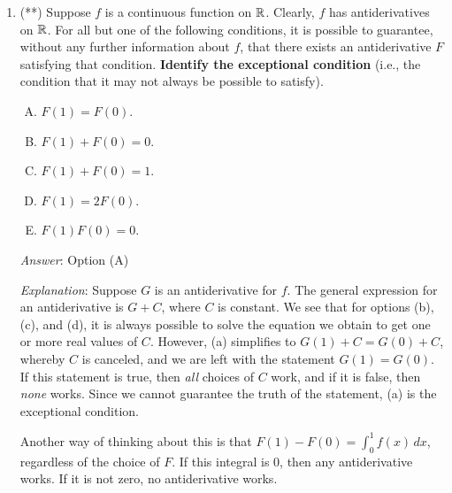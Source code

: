 \documentclass[10pt]{amsart}
\begin{document}
\begin{enumerate}
  {\em Performance review}: $4$ out of $12$ got this correct. $4$
  chose (E), $2$ chose (C), $1$ each chose (A) and (D).

  {\em Historical note (last year)}: $6$ out of $16$ people got this
  correct. Remaining were: $2$ (A), $2$ (C), $3$ (D), $3$ (E).

  {\em Action point}: This is the kind of question you should {\em
  definitely} get right in the future. Please review the notes on
  repeated integration and finding functions with given $k^{th}$
  derivative. It seems like we didn't cover this well enough in class,
  which might be the reason for the not-so-good performance. We'll
  review these ideas in class Friday.

\item (**) Suppose $f$ is a continuous function on $\mathbb{R}$. Clearly, $f$
  has antiderivatives on $\mathbb{R}$. For all but one of the following
  conditions, it is possible to guarantee, without any further
  information about $f$, that there exists an antiderivative $F$
  satisfying that condition. {\bf Identify the exceptional condition}
  (i.e., the condition that it may not always be possible to satisfy).

  \begin{enumerate}[(A)]
  \item $F(1) = F(0)$.
  \item $F(1) + F(0) = 0$.
  \item $F(1) + F(0) = 1$.
  \item $F(1) = 2F(0)$.
  \item $F(1)F(0) = 0$.
  \end{enumerate}

  {\em Answer}: Option (A)

  {\em Explanation}: Suppose $G$ is an antiderivative for $f$. The
  general expression for an antiderivative is $G + C$, where $C$ is
  constant. We see that for options (b), (c), and (d), it is always
  possible to solve the equation we obtain to get one or more real
  values of $C$. However, (a) simplifies to $G(1) + C = G(0) + C$,
  whereby $C$ is canceled, and we are left with the statement $G(1) =
  G(0)$. If this statement is true, then {\em all} choices of $C$
  work, and if it is false, then {\em none} works. Since we cannot
  guarantee the truth of the statement, (a) is the exceptional
  condition.

  Another way of thinking about this is that $F(1) - F(0) = \int_0^1
  f(x) \, dx$, regardless of the choice of $F$. If this integral is
  $0$, then any antiderivative works. If it is not zero, no
  antiderivative works.


\end{enumerate}
\end{document}
